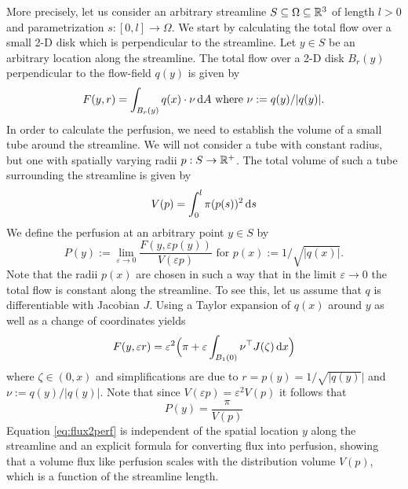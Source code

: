 \documentclass[journal,twocolumn]{IEEEtran}
\begin{document}
	More precisely, let us consider an arbitrary streamline $S \subseteq \Omega \subseteq \mathbb{R}^3$ of length $l>0$ and parametrization $s:[0,l] \to \Omega$.
	We start by calculating the total flow over a small 2-D disk which is perpendicular to the streamline.
	Let $y \in S$ be an arbitrary location along the streamline. 
	The total flow over a 2-D disk $B_r(y)$ perpendicular to the flow-field $q(y)$ is given by
	\[
		F(y,r) = \int_{B_r(y)} q(x) \cdot \nu \,\mathrm{d} A \text{ where }\nu := q(y)/\vert q(y) \vert.
	\]
	In order to calculate the perfusion, we need to establish the volume of a small tube around the streamline.
	We will not consider a tube with constant radius, but one with spatially varying radii $p:S \to \mathbb{R}^+$.
	The total volume of such a tube surrounding the streamline is given by
	\[
		V(p) = \int_0^l \pi (p(s))^2 \,\mathrm{d} s
	\]
	We define the perfusion at an arbitrary point $y \in S$ by
	\[
		P(y):=\lim_{\varepsilon \to 0} \frac{F(y,\varepsilon p(y))}{V(\varepsilon p)} \text{ for } p(x):=1/\sqrt{\vert q(x) \vert}.
	\]
	Note that the radii $p(x)$ are chosen in such a way that in the limit $\varepsilon \to 0$ the total flow is constant along the streamline. 
	To see this, let us assume that $q$ is differentiable with Jacobian $J$.
	Using a Taylor expansion of $q(x)$ around $y$ as well as a change of coordinates yields 
	\[
		F(y,\varepsilon r)
		= \varepsilon^2 \Big(\pi + \varepsilon \int_{B_{1}(0)} \nu^\top J(\zeta) \,\mathrm{d} x\Big)
	\]
	where $\zeta \in (0,x)$ and simplifications are due to $r = p(y) = 1/\sqrt{\vert q(y)} \vert$ and $\nu:=q(y)/\vert q(y) \vert$.
	Note that since $V(\varepsilon p) = \varepsilon^2 V(p)$ it follows that
	\begin{equation}\label{eq:flux2perf}
		P(y)= \frac{\pi}{V(p)}
	\end{equation}
	Equation \eqref{eq:flux2perf} is independent of the spatial location $y$ along the streamline and an explicit formula for converting flux into perfusion, showing that a volume flux like perfusion scales with the distribution volume $V(p)$, which is a function of the streamline length.
	
\end{document}
